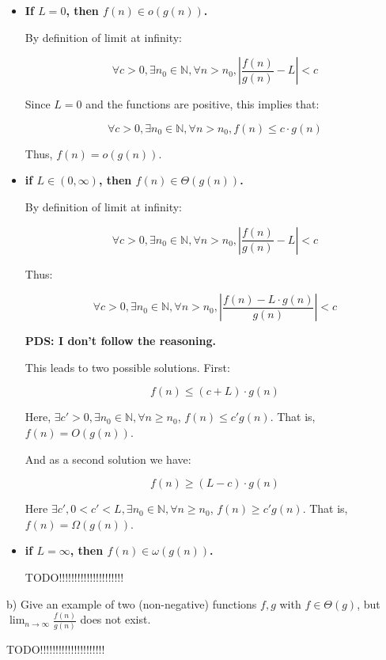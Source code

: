 \documentclass[a4paper]{article}
\newcommand*{\dave}[1]{{\color{red}\textbf{PDS: #1}}}
\begin{document}
\begin{itemize}
\item \textbf{If $L = 0$, then $f(n) \in o(g(n))$.}

By definition of limit at infinity:

$$\forall c > 0, \exists n_0 \in \mathbb{N}, \forall n > n_0, \left | \frac{f(n)}{g(n)} - L \right | < c$$

Since $L=0$ and the functions are positive, this implies that:

$$\forall c > 0, \exists n_0 \in \mathbb{N}, \forall n > n_0, f(n) \le c \cdot g(n)$$

Thus, $f(n) = o(g(n))$.

\bigskip

\item \textbf{if $L \in (0, \infty)$, then $f(n) \in \Theta(g(n))$.}

By definition of limit at infinity:

$$\forall c > 0, \exists n_0 \in \mathbb{N}, \forall n > n_0, \left | \frac{f(n)}{g(n)} - L \right | < c$$

Thus:

$$\forall c > 0, \exists n_0 \in \mathbb{N}, \forall n > n_0,  \left | \frac{f(n) - L \cdot g(n)}{g(n)} \right | < c$$

\dave{I don't follow the reasoning.}

This leads to two possible solutions. First:

$$f(n) \le (c + L) \cdot g(n)$$

Here, $\exists c' > 0, \exists n_0 \in \mathbb{N}, \forall n \ge n_0$, $f(n) \le c' g(n)$.
That is, $f(n) = O(g(n))$.

\bigskip And as a second solution we have:

$$f(n) \ge (L - c) \cdot g(n)$$

Here $\exists c', 0 < c' < L, \exists n_0 \in \mathbb{N}, \forall n \ge n_0$, $f(n) \ge c' g(n)$. That is, $f(n) = \Omega(g(n))$.

\item \textbf{if $L = \infty$, then $f(n) \in \omega(g(n))$.}

{\color{red} TODO!!!!!!!!!!!!!!!!!!!!!}

\end{itemize}

\noindent b) Give an example of two (non-negative) functions $f,g$ with $f \in \Theta(g)$, but $\lim_{n \rightarrow \infty}\frac{f(n)}{g(n)}$ does not exist.

{\color{red} TODO!!!!!!!!!!!!!!!!!!!!!}
\end{document}
